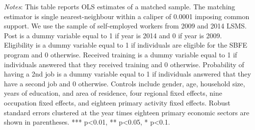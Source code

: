\begin{table}[H]
\begin{adjustbox}{max width=\textheight}
\begin{threeparttable}
\begin{tablenotes}
				\footnotesize
				\item \textit{Notes}: This table reports OLS estimates of a matched sample. The matching estimator is single nearest-neighbour within a caliper of 0.0001 imposing common support. We use the sample of self-employed workers from 2009 and 2014 LSMS. Post is a dummy variable equal to 1 if year is 2014 and 0 if year is 2009. Eligibility is a dummy variable equal to 1 if individuals are eligible for the SBFE program and 0 otherwise. Received training is a dummy variable equal to 1 if individuals answered that they received training and 0 otherwise. Probability of having a 2nd job is a dummy variable equal to 1 if individuals answered that they have a second job and 0 otherwise. Controls include gender, age, household size, years of education, and area of residence, four regional fixed effects, nine occupation fixed effects, and eighteen primary activity fixed effects. Robust standard errors clustered at the year times eighteen primary economic sectors are shown in parentheses. *** p<0.01, ** p<0.05, * p<0.1.
			\end{tablenotes}
		\end{threeparttable}
	\end{adjustbox}
\end{table}

